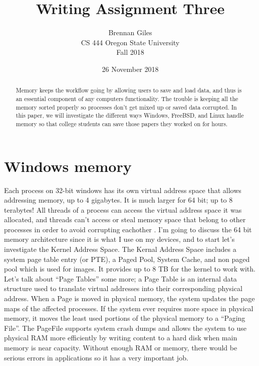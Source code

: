 \documentclass[onecolumn, draftclsnofoot,10pt, compsoc]{IEEEtran}
\title{Writing Assignment Three}
\author{Brennan Giles\\CS 444 Oregon State University\\Fall 2018}
\date {26 November 2018}
\begin{document}
\begin{titlepage}
	\maketitle
    \begin{singlespace}
        \begin{abstract}
		Memory keeps the workflow going by allowing users to save and load data, and thus is an essential component of any computers functionality. The trouble is keeping all the memory sorted properly so processes don’t get mixed up or saved data corrupted. In this paper, we will investigate the different ways Windows, FreeBSD, and Linux handle memory so that college students can save those papers they worked on for hours. 
        	
        \end{abstract}     
    \end{singlespace}
\end{titlepage}
\newpage
{}

\clearpage

\section{Windows memory}
Each process on 32-bit windows has its own virtual address space that allows addressing memory, up to 4 gigabytes. It is much larger for 64 bit; up to 8 terabytes! All threads of a process can access the virtual address space it was allocated, and threads can’t access or steal memory space that belong to other processes in order to avoid corrupting eachother \cite{WindowsDev}. I’m going to discuss the 64 bit memory architecture since it is what I use on my devices, and to start let’s investigate the Kernel Address Space. The Kernal Address Space includes a system page table entry (or PTE), a Paged Pool, System Cache, and non paged pool which is used for images. It provides up to 8 TB for the kernel to work with. Let’s talk about “Page Tables” some more; a Page Table is an internal data structure used to translate virtual addresses into their corresponding physical address. When a Page is moved in physical memory, the system updates the page maps of the affected processes. If the system ever requires more space in physical memory, it moves the least used portions of the physical memory to a “Paging File”. The PageFile supports system crash dumps and allows the system to use physical RAM more efficiently by writing content to a hard disk when main memory is near capacity. Without enough RAM or memory, there would be serious errors in applications so it has a very important job.\cite{WindowsDev}
\end{document}
